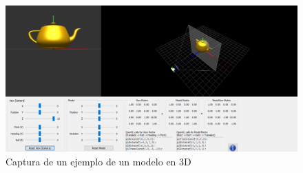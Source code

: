 \begin{enumerate}
            \begin{figure}[H]
                \centering
                \includegraphics[width=5in]{figures/teapot.png}
                \caption{Captura de un ejemplo de un modelo en 3D}
                \label{fig:modelo3D}
            \end{figure}


\end{enumerate}
